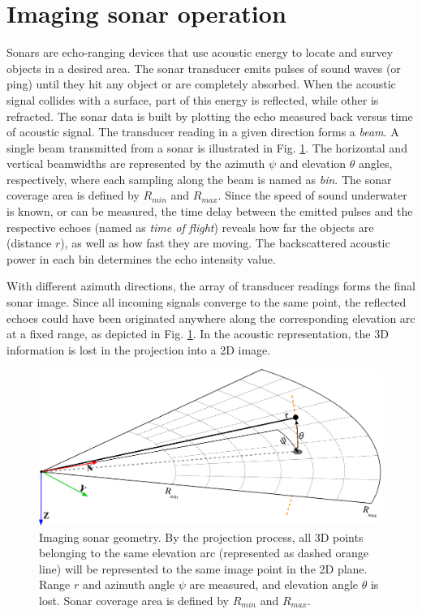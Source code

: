 \documentclass[final,5p,times]{elsarticle}
\begin{document}
\section{Imaging sonar operation}
\label{sonar:operation}

Sonars are echo-ranging devices that use acoustic energy to locate and survey
objects in a desired area. The sonar transducer emits pulses of sound waves
(or ping) until they hit any object or are completely absorbed. When the
acoustic signal collides with a surface, part of this energy is reflected,
while other is refracted. The sonar data is built by plotting the echo measured back versus time of acoustic signal. The transducer reading in a given direction forms a \textit{beam}. A single beam transmitted from a sonar is illustrated in Fig. \ref{fig:sonar_geometry}. The horizontal and vertical beamwidths are represented by the azimuth $\psi$ and elevation $\theta$ angles, respectively, where each sampling along the beam is named as \textit{bin}. The sonar coverage area is defined by $R_{min}$ and $R_{max}$. Since the speed of sound underwater is known, or can be measured, the time delay between the emitted pulses and the respective echoes (named as \textit{time of flight}) reveals how far the objects are (distance $r$), as well as how fast they are moving. The backscattered acoustic power in each bin determines the echo intensity value.

With different azimuth directions, the array of transducer readings forms the
final sonar image. Since all incoming signals converge to the same point, the
reflected echoes could have been originated anywhere along the corresponding
elevation arc at a fixed range, as depicted in Fig. \ref{fig:sonar_geometry}.
In the acoustic representation, the 3D information is lost in the projection
into a 2D image.


\begin{figure}[t]
    \includegraphics[width=\columnwidth]{figs/sonar_geometry_2}
    \captionsetup{justification=justified}
    \caption{Imaging sonar geometry. By the projection process, all 3D points  belonging to the same elevation arc (represented as dashed orange line) will be represented to the same image point in the 2D plane. Range $r$ and azimuth angle $\psi$ are measured, and elevation angle $\theta$ is lost. Sonar coverage area is defined by $R_{min}$ and $R_{max}$.}
    \label{fig:sonar_geometry}
\end{figure}
\end{document}
